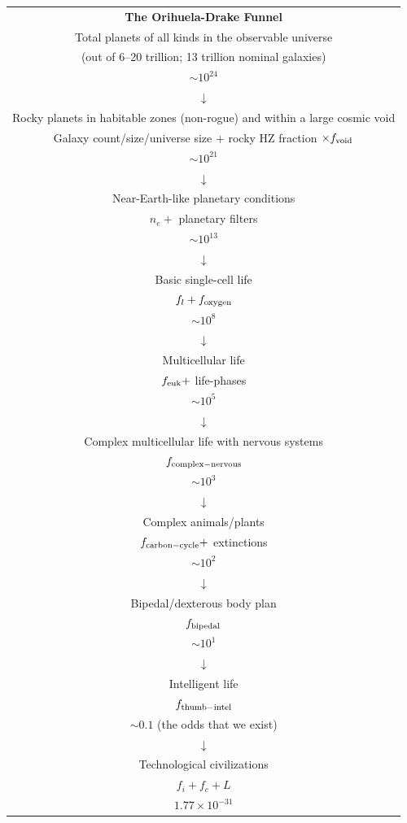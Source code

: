 \documentclass[12pt]{article}
\begin{document}
\begin{center}
\begin{tabular}{c}
\textbf{The Orihuela-Drake Funnel} \\
Total planets of all kinds in the observable universe \\
(out of 6--20 trillion; 13 trillion nominal galaxies) \\
$\sim10^{24}$ \\
$\downarrow$ \\
Rocky planets in habitable zones (non-rogue) and within a large cosmic void \\
Galaxy count/size/universe size + rocky HZ fraction $\times f_{\rm void}$ \\
$\sim10^{21}$ \\
$\downarrow$ \\
Near-Earth-like planetary conditions \\
$n_e +$ planetary filters \\
$\sim10^{13}$ \\
$\downarrow$ \\
Basic single-cell life \\
$f_l + f_{\rm oxygen}$ \\
$\sim10^{8}$ \\
$\downarrow$ \\
Multicellular life \\
$f_{\rm euk} +$ life-phases \\
$\sim10^{5}$ \\
$\downarrow$ \\
Complex multicellular life with nervous systems \\
$f_{\rm complex-nervous}$ \\
$\sim10^{3}$ \\
$\downarrow$ \\
Complex animals/plants \\
$f_{\rm carbon-cycle} +$ extinctions \\
$\sim10^{2}$ \\
$\downarrow$ \\
Bipedal/dexterous body plan \\
$f_{\rm bipedal}$ \\
$\sim10^{1}$ \\
$\downarrow$ \\
Intelligent life \\
$f_{\rm thumb-intel}$ \\
$\sim0.1$ (the odds that we exist) \\
$\downarrow$ \\
Technological civilizations \\
$f_i + f_c + L$ \\
$1.77 \times 10^{-31}$
\end{tabular}
\end{center}
\end{document}
